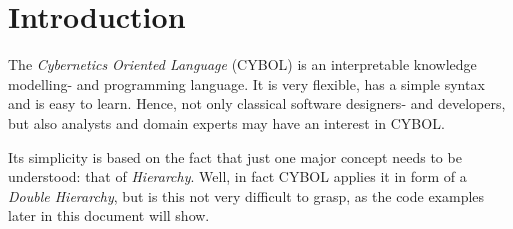 %
%
%
%
%
%

\chapter{Introduction}
\label{introduction_heading}

The \emph{Cybernetics Oriented Language} (CYBOL) is an interpretable knowledge
modelling- and programming language. It is very flexible, has a simple syntax
and is easy to learn. Hence, not only classical software designers- and
developers, but also analysts and domain experts may have an interest in CYBOL.

Its simplicity is based on the fact that just one major concept needs to be
understood: that of \emph{Hierarchy}. Well, in fact CYBOL applies it in form of
a \emph{Double Hierarchy}, but is this not very difficult to grasp, as the code
examples later in this document will show.



